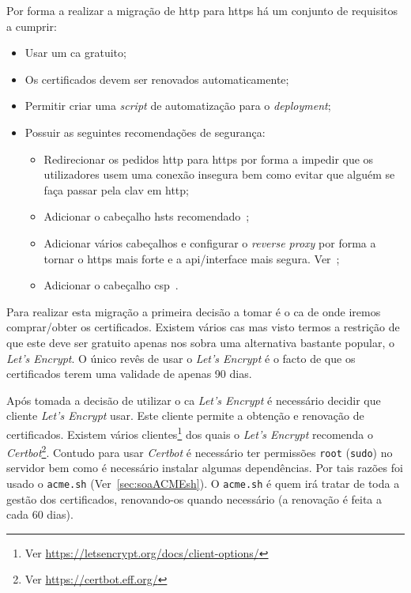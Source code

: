 Por forma a realizar a migração de \acrshort{http} para \acrshort{https} há um conjunto de requisitos a cumprir:\label{sec:sol_httpsReq}
\begin{itemize}
    \item Usar um \acrshort{ca} gratuito;
    \item Os certificados devem ser renovados automaticamente;
    \item Permitir criar uma \textit{script} de automatização para o \textit{deployment};
    \item Possuir as seguintes recomendações de segurança:
    \begin{itemize}
        \item Redirecionar os pedidos \acrshort{http} para \acrshort{https} por forma a impedir que os 
        utilizadores usem uma conexão insegura bem como evitar que alguém se faça passar pela \acrshort{clav} 
        em \acrshort{http};
        \item Adicionar o cabeçalho \acrshort{hsts} recomendado~\cite{hsts,hsts2};
        \item Adicionar vários cabeçalhos e configurar o \textit{reverse proxy} por forma a tornar o 
        \acrshort{https} mais forte e a \acrshort{api}/interface mais segura. 
        Ver~\cite{helmet,letEnA+,dhparams,secExpress,strongSSL};
        \item Adicionar o cabeçalho \acrfull{csp}~\cite{helmetCSP,csp}.
    \end{itemize}
\end{itemize}

Para realizar esta migração a primeira decisão a tomar é o \acrfull{ca} de onde iremos comprar/obter os 
certificados. Existem vários \acrshort{ca}s mas visto termos a restrição de que este deve ser gratuito 
apenas nos sobra uma alternativa bastante popular, o \textit{Let's Encrypt}. 
O único revês de usar o \textit{Let's Encrypt} é o facto de que os certificados terem uma validade de apenas 90 dias.

Após tomada a decisão de utilizar o \acrshort{ca} \textit{Let's Encrypt} é necessário decidir que cliente 
\textit{Let's Encrypt} usar. Este cliente permite a obtenção e renovação de certificados. 
Existem vários clientes\footnote{Ver \url{https://letsencrypt.org/docs/client-options/}} dos quais o 
\textit{Let's Encrypt} recomenda o \textit{Certbot}\footnote{Ver \url{https://certbot.eff.org/}}. 
Contudo para usar \textit{Certbot} é necessário ter permissões \texttt{root} (\texttt{sudo}) no servidor bem 
como é necessário instalar algumas dependências. 
Por tais razões foi usado o \texttt{acme.sh} (Ver~\ref{sec:soaACMEsh}). 
O \texttt{acme.sh} é quem irá tratar de toda a gestão dos certificados, renovando-os quando necessário 
(a renovação é feita a cada 60 dias).

